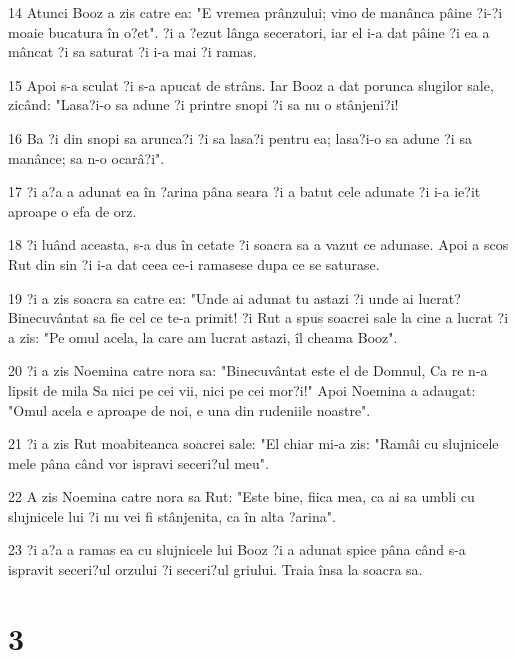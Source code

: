\par 14 Atunci Booz a zis catre ea: "E vremea prânzului; vino de manânca pâine ?i-?i moaie bucatura în o?et". ?i a ?ezut lânga seceratori, iar el i-a dat pâine ?i ea a mâncat ?i sa saturat ?i i-a mai ?i ramas.
\par 15 Apoi s-a sculat ?i s-a apucat de strâns. Iar Booz a dat porunca slugilor sale, zicând: "Lasa?i-o sa adune ?i printre snopi ?i sa nu o stânjeni?i!
\par 16 Ba ?i din snopi sa arunca?i ?i sa lasa?i pentru ea; lasa?i-o sa adune ?i sa manânce; sa n-o ocarâ?i".
\par 17 ?i a?a a adunat ea în ?arina pâna seara ?i a batut cele adunate ?i i-a ie?it aproape o efa de orz.
\par 18 ?i luând aceasta, s-a dus în cetate ?i soacra sa a vazut ce adunase. Apoi a scos Rut din sin ?i i-a dat ceea ce-i ramasese dupa ce se saturase.
\par 19 ?i a zis soacra sa catre ea: "Unde ai adunat tu astazi ?i unde ai lucrat? Binecuvântat sa fie cel ce te-a primit! ?i Rut a spus soacrei sale la cine a lucrat ?i a zis: "Pe omul acela, la care am lucrat astazi, îl cheama Booz".
\par 20 ?i a zis Noemina catre nora sa: "Binecuvântat este el de Domnul, Ca re n-a lipsit de mila Sa nici pe cei vii, nici pe cei mor?i!" Apoi Noemina a adaugat: "Omul acela e aproape de noi, e una din rudeniile noastre".
\par 21 ?i a zis Rut moabiteanca soacrei sale: "El chiar mi-a zis: "Ramâi cu slujnicele mele pâna când vor ispravi seceri?ul meu".
\par 22 A zis Noemina catre nora sa Rut: "Este bine, fiica mea, ca ai sa umbli cu slujnicele lui ?i nu vei fi stânjenita, ca în alta ?arina".
\par 23 ?i a?a a ramas ea cu slujnicele lui Booz ?i a adunat spice pâna când s-a ispravit seceri?ul orzului ?i seceri?ul griului. Traia însa la soacra sa.

\chapter{3}

